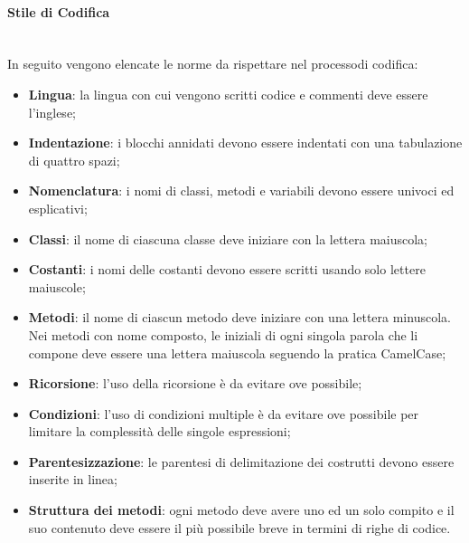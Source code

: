 \paragraph*{Stile di Codifica}\mbox{}\\ [1mm]
In seguito vengono elencate le norme da rispettare nel processo\glosp di codifica:
\begin{itemize}
	\item \textbf{Lingua}: la lingua con cui vengono scritti codice e commenti deve essere l'inglese;
	\item \textbf{Indentazione}: i blocchi annidati devono essere indentati con una tabulazione di quattro spazi;
	\item \textbf{Nomenclatura}: i nomi di classi, metodi e variabili devono essere univoci ed esplicativi;
	\item \textbf{Classi}: il nome di ciascuna classe deve iniziare con la lettera maiuscola; 
	\item \textbf{Costanti}: i nomi delle costanti devono essere scritti usando solo lettere maiuscole;
	\item \textbf{Metodi}: il nome di ciascun metodo deve iniziare con una lettera minuscola. Nei metodi con nome composto, le iniziali di ogni singola parola che li compone deve essere una lettera maiuscola seguendo la pratica CamelCase;
	\item \textbf{Ricorsione}: l'uso della ricorsione è da evitare ove possibile;
	\item \textbf{Condizioni}: l'uso di condizioni multiple è da evitare ove possibile per limitare la complessità delle singole espressioni;
	\item \textbf{Parentesizzazione}: le parentesi di delimitazione dei costrutti devono essere inserite in linea;
	\item \textbf{Struttura dei metodi}: ogni metodo deve avere uno ed un solo compito e il suo contenuto deve essere il più possibile breve in termini di righe di codice.
\end{itemize}
